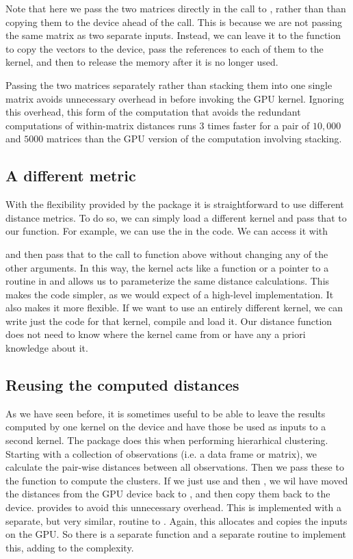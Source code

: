 Note that here we pass the two matrices directly in the call to
, rather than than copying them to the device ahead of the
call.  This is because we are not passing the same matrix as two
separate inputs.  Instead, we can leave it to the 
function to copy the vectors to the device, pass the references
to each of them to the kernel, and then to release the memory 
after it is no longer used. 

Passing the two matrices separately rather than stacking them into one
single matrix avoids unnecessary overhead in \R{} before invoking the
GPU kernel. Ignoring this overhead, this form of the computation that
avoids the redundant computations of within-matrix distances runs 3
times faster for a pair of $10,000$ and $5000$ matrices than the GPU
version of the computation involving stacking.


\subsection{A different metric}
With the flexibility provided by the  package it
is straightforward to use different distance metrics. To do so, 
we can simply load a different kernel and pass that to our function. 
For example, we can use the  in the
 code.
We can access it with 
and then pass that to the call to  function above without
changing any of the other arguments.  In this way, the kernel acts
like a function or a pointer to a routine in \C{} and allows us to
parameterize the same distance calculations.  This makes the code
simpler, as we would expect of a high-level implementation.  It also
makes it more flexible. If we want to use an entirely different
kernel, we can write just the code for that kernel, compile and load
it.  Our distance function does not need to know where the kernel came
from or have any a priori knowledge about it.


\subsection{Reusing the computed distances}
As we have seen before, it is sometimes useful to be able to leave the
results computed by one kernel on the device and have those be used as
inputs to a second kernel.  The  package does this when
performing hierarhical clustering.  Starting with a collection of
observations (i.e. a data frame or matrix), we calculate the pair-wise
distances between all observations.  Then we pass these to the
 function to compute the clusters.  If we just use
 and then , we wil have moved the
distances from the GPU device back to \R, and then copy them back to
the device.   provides  to avoid
this unnecessary overhead.  This is implemented with a separate, but
very similar, routine to .  Again, this allocates and
copies the inputs on the GPU.  So there is a separate \R{} function
and a separate \C{} routine to implement this, adding to the
complexity.

